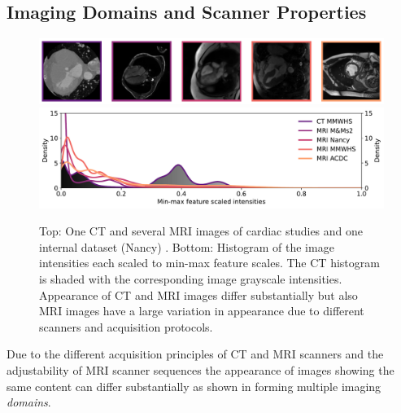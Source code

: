     \subsection{Imaging Domains and Scanner Properties} %

        \begin{figure}
            \begin{minipage}{\textwidth}
                \centering
                \includegraphics[width=.89\textwidth]{sections/02_background/figures/contrast_imgs.pdf}
                \includegraphics[width=\textwidth]{sections/02_background/figures/contrast_histograms.pdf}
                \caption{Top: One \ac{CT} and several \ac{MRI} images of cardiac studies and one internal dataset (Nancy) \citep{zhuang2019evaluation,martin2023deep,
                campello2021multi,bernard2018deep}. Bottom: Histogram of the image intensities each scaled to min-max feature scales. The \ac{CT} histogram is shaded with the corresponding image grayscale intensities. Appearance of \ac{CT} and \ac{MRI} images differ substantially but also \ac{MRI} images have a large variation in appearance due to different scanners and acquisition protocols.}
                \label{fig:domain_contrast}
            \end{minipage}
        \end{figure}

        Due to the different acquisition principles of \ac{CT} and \ac{MRI} scanners and the adjustability of \ac{MRI} scanner sequences the appearance of images showing the same content can differ substantially as shown in  forming multiple imaging \emph{domains}.

